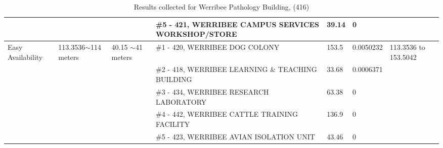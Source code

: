 \begin{table}[H]
{\begin{tabular}{|l|l|l|l|l|l|l|}
                        &                          &                                                 & \#5 - 421, WERRIBEE CAMPUS SERVICES WORKSHOP/STORE    & 39.14         & 0               &                           \\ \hline
Easy Availability       & 113.3536$\sim$114 meters & 40.15 $\sim$41 meters                           & \#1 - 420, WERRIBEE DOG COLONY                        & 153.5         & 0.0050232       & 113.3536 to 153.5042      \\ \hline
                        &                          &                                                 & \#2 - 418, WERRIBEE LEARNING \& TEACHING BUILDING     & 33.68         & 0.0006371       &                           \\ \hline
                        &                          &                                                 & \#3 - 434, WERRIBEE RESEARCH LABORATORY               & 63.38         & 0               &                           \\ \hline
                        &                          &                                                 & \#4 - 442, WERRIBEE CATTLE TRAINING FACILITY          & 136.9         & 0               &                           \\ \hline
                        &                          &                                                 & \#5 - 423, WERRIBEE AVIAN ISOLATION UNIT              & 43.46         & 0               &                           \\ \hline
\end{tabular}
}
\caption{Results collected for Werribee Pathology Building, (416)}
\label{appendix:wer-path}
\end{table}

